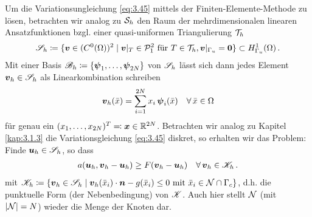 Um die Variationsungleichung \eqref{eq:3.45} mittels  der Finiten-Elemente-Methode zu lösen, betrachten wir analog zu $\mathcal S_h$ den Raum der mehrdimensionalen linearen  Ansatzfunktionen bzgl. einer quasi-uniformen Triangulierung $\mathcal T_h$
\begin{align}\label{eq:3.53}
	 \mathscr S_h \coloneqq \{\boldsymbol v \in (C^0(\Omega))^2 \mid \boldsymbol v|_T \in \mathcal P_1^2 \text{ für } T \in \mathcal T_h, \boldsymbol v|_{\Gamma_u} = \boldsymbol 0\} \subset H^1_{\Gamma_u} (\Omega)\, .
\end{align}
Mit einer Basis $\mathscr B_h \coloneqq \{\boldsymbol\psi_1,\ldots,\boldsymbol \psi_{2N}\}$ von $\mathscr S_h$ lässt sich dann jedes Element $\boldsymbol v_h \in \mathscr S_h$ als Linearkombination schreiben
\begin{align}\label{eq:3.54}
	\boldsymbol v_h(\bar x) = \sum_{i = 1}^{2N} x_i \, \boldsymbol \psi_i(\bar x) \quad \forall \, \bar x \in \Omega
\end{align}
für genau ein $(x_1,\ldots,x_{2N})^T \eqqcolon \boldsymbol x \in \mathbb{R}^{2N}$. Betrachten wir analog zu Kapitel \ref{kap:3.1.3} die Variationsgleichung \eqref{eq:3.45} diskret, so erhalten wir das Problem: Finde $\boldsymbol u_h \in \mathscr S_h$, so dass
\begin{align}\label{eq:3.55}
	a(\boldsymbol u_h, \boldsymbol v_h - \boldsymbol u_h) \ge F(\boldsymbol v_h- \boldsymbol u_h) \quad \forall \, \boldsymbol v_h \in \mathscr K_h \, .
\end{align}
mit $\mathscr K_h \coloneqq \{  \boldsymbol v_h \in \mathscr S_h \mid \boldsymbol v_h(\bar x_i) \cdot \boldsymbol n - g(\bar x_i) \le 0 \text{ mit } \bar x_i \in \mathcal N \cap \Gamma_c\}$, d.h. die punktuelle Form (der Nebenbedingung) von $\mathscr K$. Auch hier stellt $\mathcal N$ (mit $\lvert \mathcal N\rvert = N$) wieder die Menge der Knoten dar.

